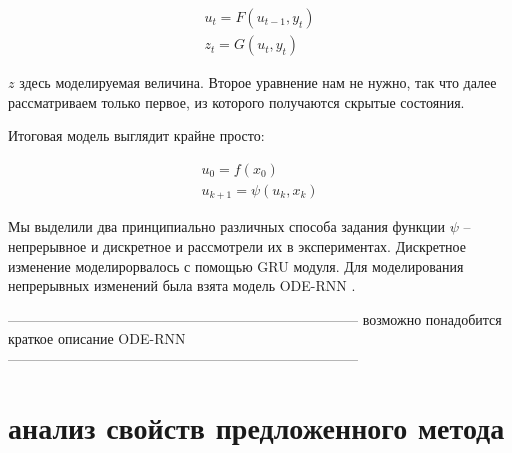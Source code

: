 \documentclass[12pt, twoside]{article}
\begin{document}
\begin{equation}
	\begin{split}
		u_t = F(u_{t-1}, y_t) \\ 
		z_{t} = G(u_t, y_t)
	\end{split}
\end{equation}

$z$ здесь моделируемая величина. Второе уравнение нам не нужно, так что далее рассматриваем только первое, из которого получаются скрытые состояния.

Итоговая модель выглядит крайне просто:

\begin{equation}
	\begin{split}
		u_0 = f(x_0) \\ 
		u_{k + 1} = \psi(u_k, x_k)
	\end{split}
\end{equation}

Мы выделили два принципиально различных способа задания функции $\psi$ -- непрерывное и дискретное и рассмотрели их в экспериментах. Дискретное изменение моделирорвалось с помощью GRU модуля. Для моделирования непрерывных изменений была взята модель ODE-RNN \cite{rubanova2019latent}.



---------------------------------------------------------------------------
возможно понадобится краткое описание ODE-RNN
---------------------------------------------------------------------------

\section{анализ свойств предложенного метода}
\label{sec:theor_background}
\end{document}
